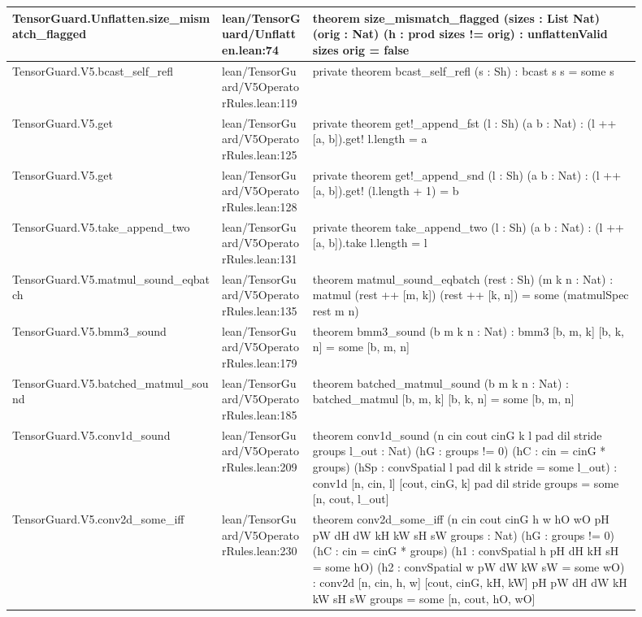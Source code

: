 \documentclass[10pt]{article}
\begin{document}
\begin{longtable}{|p{0.30\linewidth}|p{0.13\linewidth}|p{0.47\linewidth}|}
\hline
TensorGuard.Unflatten.size\_mismatch\_flagged & lean/TensorGuard/Unflatten.lean:74 & theorem size\_mismatch\_flagged (sizes : List Nat) (orig : Nat) (h : prod sizes != orig) : unflattenValid sizes orig = false \\
\hline
TensorGuard.V5.bcast\_self\_refl & lean/TensorGuard/V5OperatorRules.lean:119 & private theorem bcast\_self\_refl (s : Sh) : bcast s s = some s \\
\hline
TensorGuard.V5.get & lean/TensorGuard/V5OperatorRules.lean:125 & private theorem get!\_append\_fst (l : Sh) (a b : Nat) : (l ++ [a, b]).get! l.length = a \\
\hline
TensorGuard.V5.get & lean/TensorGuard/V5OperatorRules.lean:128 & private theorem get!\_append\_snd (l : Sh) (a b : Nat) : (l ++ [a, b]).get! (l.length + 1) = b \\
\hline
TensorGuard.V5.take\_append\_two & lean/TensorGuard/V5OperatorRules.lean:131 & private theorem take\_append\_two (l : Sh) (a b : Nat) : (l ++ [a, b]).take l.length = l \\
\hline
TensorGuard.V5.matmul\_sound\_eqbatch & lean/TensorGuard/V5OperatorRules.lean:135 & theorem matmul\_sound\_eqbatch (rest : Sh) (m k n : Nat) : matmul (rest ++ [m, k]) (rest ++ [k, n]) = some (matmulSpec rest m n) \\
\hline
TensorGuard.V5.bmm3\_sound & lean/TensorGuard/V5OperatorRules.lean:179 & theorem bmm3\_sound (b m k n : Nat) : bmm3 [b, m, k] [b, k, n] = some [b, m, n] \\
\hline
TensorGuard.V5.batched\_matmul\_sound & lean/TensorGuard/V5OperatorRules.lean:185 & theorem batched\_matmul\_sound (b m k n : Nat) : batched\_matmul [b, m, k] [b, k, n] = some [b, m, n] \\
\hline
TensorGuard.V5.conv1d\_sound & lean/TensorGuard/V5OperatorRules.lean:209 & theorem conv1d\_sound (n cin cout cinG k l pad dil stride groups l\_out : Nat) (hG : groups != 0) (hC : cin = cinG * groups) (hSp : convSpatial l pad dil k stride = some l\_out) : conv1d [n, cin, l] [cout, cinG, k] pad dil stride groups = some [n, cout, l\_out] \\
\hline
TensorGuard.V5.conv2d\_some\_iff & lean/TensorGuard/V5OperatorRules.lean:230 & theorem conv2d\_some\_iff (n cin cout cinG h w hO wO pH pW dH dW kH kW sH sW groups : Nat) (hG : groups != 0) (hC : cin = cinG * groups) (h1 : convSpatial h pH dH kH sH = some hO) (h2 : convSpatial w pW dW kW sW = some wO) : conv2d [n, cin, h, w] [cout, cinG, kH, kW] pH pW dH dW kH kW sH sW groups = some [n, cout, hO, wO] \\

\end{longtable}
\end{document}
